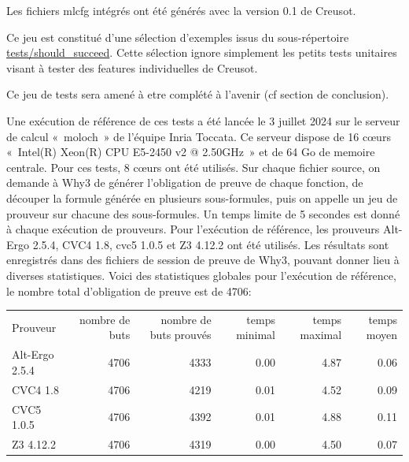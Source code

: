 \documentclass[a4paper,11pt]{article}
\begin{document}
Les fichiers mlcfg intégrés ont été générés avec la version 0.1 de
Creusot.

Ce jeu est constitué d'une sélection d'exemples issus du
sous-répertoire \url{tests/should_succeed}. Cette sélection ignore
simplement les petits tests unitaires visant à tester des features
individuelles de Creusot.

Ce jeu de tests sera amené à etre complété à l'avenir (cf section de conclusion).

Une exécution de référence de ces tests a été lancée le 3 juillet 2024
sur le serveur de calcul «~moloch~» de l'équipe Inria Toccata. Ce
serveur dispose de 16 c{\oe}urs «~Intel(R) Xeon(R) CPU E5-2450 v2 @
2.50GHz~» et de 64 Go de memoire centrale. Pour ces tests, 8 c{\oe}urs
ont été utilisés. Sur chaque fichier source, on demande à Why3 de
générer l'obligation de preuve de chaque fonction, de découper la
formule générée en plusieurs sous-formules, puis on appelle un jeu de
prouveur sur chacune des sous-formules. Un temps limite de 5 secondes est donné à chaque exécution de prouveurs. Pour l'exécution de référence,
les prouveurs Alt-Ergo 2.5.4, CVC4 1.8, cvc5 1.0.5 et Z3 4.12.2 ont
été utilisés. Les résultats sont enregistrés dans des fichiers de
session de preuve de Why3, pouvant donner lieu à diverses
statistiques. Voici des statistiques globales pour l'exécution de
référence, le nombre total d'obligation de preuve est de 4706:
\begin{center}
  \begin{tabular}{|l|r|r|r|r|r|}
    \hline
  \rowcolor{gray!50} Prouveur
  & \multicolumn{1}{p{0.13\textwidth}|}{nombre de buts}
  & \multicolumn{1}{p{0.13\textwidth}|}{nombre de buts prouvés}
  & \multicolumn{1}{p{0.13\textwidth}|}{temps minimal}
  & \multicolumn{1}{p{0.13\textwidth}|}{temps maximal}
  & \multicolumn{1}{p{0.13\textwidth}|}{temps moyen}
  \\
  Alt-Ergo 2.5.4                &  4706  & 4333   & 0.00  & 4.87  & 0.06 \\
  CVC4 1.8                      &  4706  & 4219   & 0.01  & 4.52  & 0.09 \\
  CVC5 1.0.5                    &  4706  & 4392   & 0.01  & 4.88  & 0.11 \\
  Z3 4.12.2                     &  4706  & 4319   & 0.00  & 4.50  & 0.07 \\
  \hline
\end{tabular}
\end{center}
\end{document}
